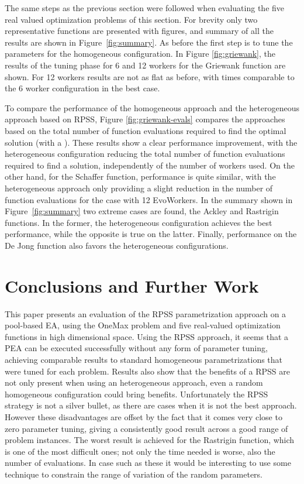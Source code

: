 \documentclass[conference]{IEEEtran}
\begin{document}
The same steps as the previous section were followed when evaluating the five real valued
optimization problems of this section.  For brevity only two representative functions are
presented with figures, and summary of all the results are shown in Figure~\ref{fig:summary}. As before
the first step is to tune the parameters for the homogeneous configuration.
In Figure \ref{fig:griewank}, the results of the tuning phase for 6 and 12 workers
for the Griewank function are shown. For 12 workers results are not as flat as before,
with times comparable to the 6 worker configuration in the best case.

To compare the performance of the homogeneous approach and the heterogeneous approach based on RPSS,
Figure \ref{fig:griewank-evals} compares the approaches based on the total number of function
evaluations required to find the optimal solution (with a ).
These results show a clear performance improvement, with the heterogeneous configuration
reducing the total number of function evaluations required to find a solution,
independently of the number of workers used.
On the other hand, for the Schaffer function, performance is quite similar,
with the heterogeneous approach only providing a slight reduction in the number
of function evaluations for the case with 12 EvoWorkers.
In the summary shown in Figure~\ref{fig:summary} two extreme cases are found, the Ackley and Rastrigin functions.
In the former, the heterogeneous configuration achieves the best performance, while the opposite is true on the latter.
Finally, performance on the De Jong function also favors the heterogeneous configurations.

\section{Conclusions and Further Work}
\label{sec:conclusions}
This paper presents an evaluation of the RPSS parametrization approach on
a pool-based EA, using the OneMax problem and five real-valued optimization functions
in high dimensional space.
Using the RPSS approach, it seems that a PEA can be executed successfully
without any form of parameter tuning, achieving comparable results to standard homogeneous
parametrizations that were tuned for each problem.
Results also show that the benefits of a RPSS are not only present
when using an heterogeneous approach, even a random homogeneous configuration could bring
benefits. Unfortunately the RPSS strategy is not a silver bullet, as there are cases
when it is not the best approach. However these disadvantages are
offset by the fact that it comes very close to zero parameter tuning,
giving a consistently good result across a good range of problem instances.
The worst result is achieved for the Rastrigin function, which
is one of the most difficult ones; not only the time needed is worse,
also the number of evaluations. In case such as these it would be
interesting to use some technique to constrain the range of variation
of the random parameters.
\end{document}
